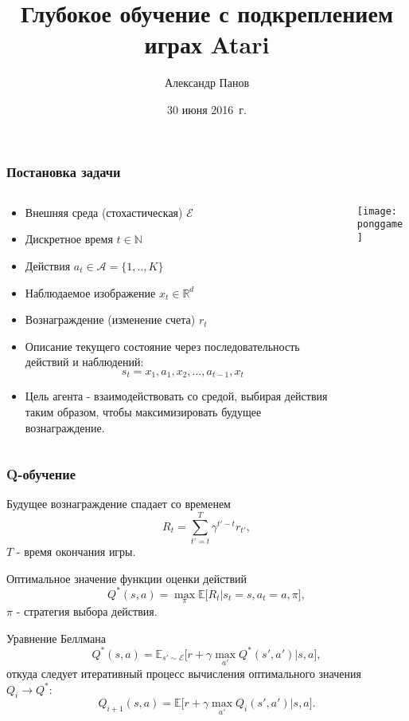 \documentclass[default]{beamer}
\begin{document}
	
	\title[DQN]{Глубокое обучение с подкреплением играх Atari}
	\author[Панов]{Александр Панов}
	\date{30 июня 2016~г.} 
	
	\begin{frame}
		\titlepage
	\end{frame}
		
	\begin{frame}
		\frametitle{Постановка задачи}

		\begin{columns}
			\begin{column}{0.7\textwidth}
				\begin{itemize}
					\item Внешняя среда (стохастическая) $\mathcal E$
					\item Дискретное время $t\in\mathbb N$
					\item Действия $a_t \in \mathcal A=\{1,..,K\}$
					\item Наблюдаемое изображение $x_t\in\mathbb R^d$
					\item Вознаграждение (изменение счета) $r_t$
					\item Описание текущего состояние через последовательность действий и наблюдений:
					\[
					s_t = x_1,a_1,x_2,\dots,a_{t-1},x_t
					\]
					\item Цель агента - взаимодействовать со средой, выбирая действия таким образом, чтобы максимизировать будущее вознаграждение.
				\end{itemize}
			\end{column}
			\begin{column}{0.3\textwidth}
				\centering
				\texttt{[image: ponggame]}
			\end{column}
		\end{columns}
		
		\par\medskip
		\nocite{*}
		\printbibliography
	\end{frame}
	

	\begin{frame}	
		\frametitle{Q-обучение}
		\small
		Будущее вознаграждение спадает со временем 
		\[
			R_t=\sum_{t'=t}^T \gamma^{t'-t}r_{t'},
		\]
		$T$ - время окончания игры.
		\par\medskip
		Оптимальное значение функции оценки действий
		\[
			Q^*(s,a) = \max_\pi\mathbb E\big[R_t|s_t=s,a_t=a,\pi\big],
		\]
		$\pi$ - стратегия выбора действия.		
		\par\medskip
		Уравнение Беллмана
		\[
			Q^*(s,a) = \mathbb E_{s'\sim\mathcal E}\big[r+\gamma\max_{a'}Q^*(s',a')\big|s,a\big],
		\]
		откуда следует итеративный процесс вычисления оптимального значения $Q_i\rightarrow Q^*$:
		\[
			Q_{i+1}(s,a) = \mathbb E\big[r+\gamma\max_{a'}Q_i(s',a')\big|s,a\big].
		\]
	\end{frame}	
\end{document}
